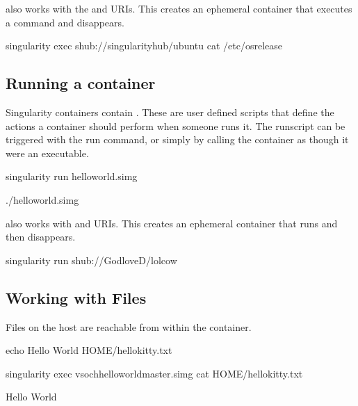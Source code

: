 \documentclass[letterpaper,10pt,english]{sphinxmanual}
\begin{document}
 also works with the  and  URIs. This creates an ephemeral container that
executes a command and disappears.

%
\begin{sphinxVerbatim}[commandchars=\\\{\}]
\PYGZdl{} singularity exec shub://singularityhub/ubuntu cat /etc/os\PYGZhy{}release
\end{sphinxVerbatim}


\subsection{Running a container}
\label{\detokenize{quick_start:running-a-container}}
Singularity containers contain {\hyperref[\detokenize{container_recipes:runscript}]{}}. These are user defined scripts that
define the actions a container should perform when someone runs it. The
runscript can be triggered with the run command, or simply by calling
the container as though it were an executable.

%
\begin{sphinxVerbatim}[commandchars=\\\{\}]
\PYGZdl{} singularity run hello\PYGZhy{}world.simg

\PYGZdl{} ./hello\PYGZhy{}world.simg
\end{sphinxVerbatim}

 also works with  and  URIs. This creates an ephemeral container that runs
and then disappears.

%
\begin{sphinxVerbatim}[commandchars=\\\{\}]
\PYGZdl{} singularity run shub://GodloveD/lolcow
\end{sphinxVerbatim}


\subsection{Working with Files}
\label{\detokenize{quick_start:working-with-files}}
Files on the host are reachable from within the container.

%
\begin{sphinxVerbatim}[commandchars=\\\{\}]
\PYGZdl{} echo \PYGZdq{}Hello World\PYGZdq{} \PYGZgt{} \PYGZdl{}HOME/hello\PYGZhy{}kitty.txt

\PYGZdl{} singularity exec vsoch\PYGZhy{}hello\PYGZhy{}world\PYGZhy{}master.simg cat \PYGZdl{}HOME/hello\PYGZhy{}kitty.txt

Hello World
\end{sphinxVerbatim}
\end{document}
